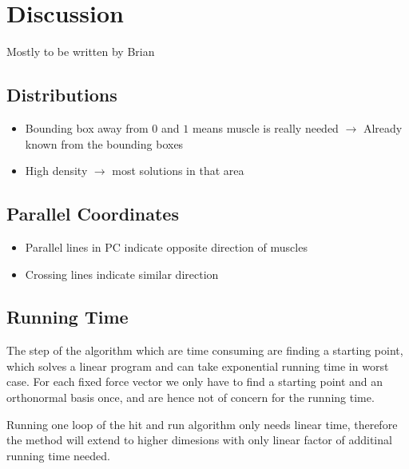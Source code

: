 \section{Discussion}
Mostly to be written by Brian
\subsection{Distributions}

\begin{itemize}
	\item Bounding box away from $0$ and $1$ means muscle is really needed $\rightarrow$ Already known from the bounding boxes
	\item High density $\rightarrow$ most solutions in that area
\end{itemize}

\subsection{Parallel Coordinates}
\begin{itemize}
	\item Parallel lines in PC indicate opposite direction of muscles
	\item Crossing lines indicate similar direction

\end{itemize}

\subsection{Running Time}
The step of the algorithm which are time consuming are finding a starting point, which solves a linear program and can take exponential running time in worst case. For each fixed force vector we only have to find a starting point and an orthonormal basis once, and are hence not of concern for the running time.

Running one loop of the hit and run algorithm only needs linear time, therefore the method will extend to higher dimesions with only linear factor of additinal running time needed.